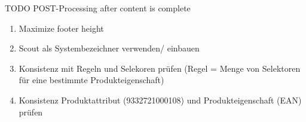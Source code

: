 TODO POST-Processing after content is complete

\begin{enumerate}
    \item Maximize footer height
    \item Scout als Systembezeichner verwenden/ einbauen
    \item Konsistenz mit Regeln und Selekoren prüfen (Regel = Menge von Selektoren für eine bestimmte Produkteigenschaft)
    \item Konsistenz Produktattribut (9332721000108) und Produkteigenschaft (EAN) prüfen
\end{enumerate}